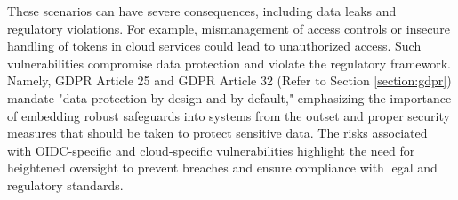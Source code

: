 These scenarios can have severe consequences, including data leaks and regulatory violations. For example, mismanagement of access controls or insecure handling of tokens in cloud services could lead to unauthorized access. Such vulnerabilities compromise data protection and violate the regulatory framework. Namely, GDPR Article 25 and GDPR Article 32 (Refer to Section \ref{section:gdpr}) mandate "data protection by design and by default," emphasizing the importance of embedding robust safeguards into systems from the outset and proper security measures that should be taken to protect sensitive data. The risks associated with OIDC-specific and cloud-specific vulnerabilities highlight the need for heightened oversight to prevent breaches and ensure compliance with legal and regulatory standards.


      